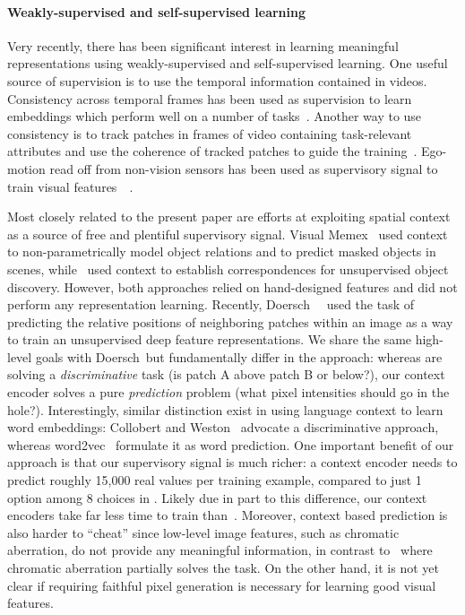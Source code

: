 \documentclass[10pt,twocolumn,letterpaper]{article}
\begin{document}
\paragraph{Weakly-supervised and self-supervised learning}
Very recently, there has been significant interest in learning meaningful representations using weakly-supervised and self-supervised learning.
One useful source of supervision is to use the temporal information contained in videos.
Consistency across temporal frames has been used as supervision to learn embeddings which perform well on a number of tasks~\cite{goroshin2015unsupervised,ramanathan2015learning}.
Another way to use consistency is to track patches in frames of video containing task-relevant attributes and use the coherence of tracked patches to guide the training~\cite{wang2015unsupervised}.
Ego-motion read off from non-vision sensors has been used as supervisory signal to train visual features~\etal~\cite{agrawal2015learning,jayaraman2015learning}.

Most closely related to the present paper are efforts at exploiting spatial context as a source of free and plentiful supervisory signal.
Visual Memex~\cite{malisiewicz2009beyond} used context to non-parametrically model object relations and to predict masked objects in scenes, while~\cite{doersch2014context} used context to establish correspondences for unsupervised object discovery.
However, both approaches relied on hand-designed features and did not perform any representation learning.
Recently, Doersch~\etal~\cite{doersch2015unsupervised} used the task of predicting the relative positions of neighboring patches within an image as a way to train an unsupervised deep feature representations.  We share the same high-level goals with Doersch~\etal but fundamentally differ in the approach: whereas \cite{doersch2015unsupervised} are solving a \textit{discriminative} task (is patch A above patch B or below?), our context encoder solves a pure \textit{prediction} problem (what pixel intensities should go in the hole?).  Interestingly, similar distinction exist in using language context to learn word embeddings: Collobert and Weston~\cite{collobert2008unified} advocate a discriminative approach, whereas word2vec~\cite{mikolov2013distributed} formulate it as word prediction.
One important benefit of our approach is that our supervisory signal is much richer: a context encoder needs to predict roughly 15,000 real values per training example, compared to just 1 option among 8 choices in \cite{doersch2015unsupervised}.
Likely due in part to this difference, our context encoders take far less time to train than~\cite{doersch2015unsupervised}.
Moreover, context based prediction is also harder to ``cheat'' since low-level image features, such as chromatic aberration, do not provide any meaningful information, in contrast to~\cite{doersch2015unsupervised} where chromatic aberration partially solves the task.  On the other hand, it is not yet clear if requiring faithful pixel generation is necessary for learning good visual features.
\end{document}
